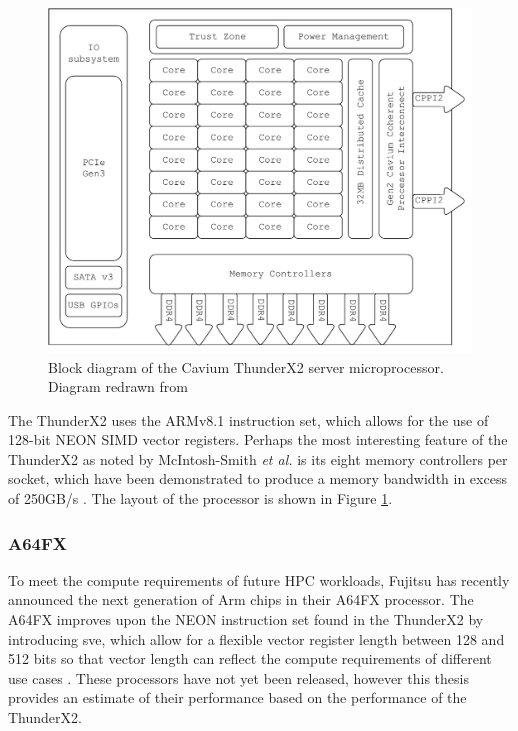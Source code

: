 \documentclass[a4paper,11pt]{report}
\begin{document}
\begin{figure}[htbp]
\begin{center}
\includegraphics[width=1\textwidth]{img/thunderx2.pdf}
\caption[Block diagram of the Cavium ThunderX2 server microprocessor]{Block diagram of the Cavium ThunderX2 server microprocessor. Diagram redrawn from \cite{thunderprocessor2018brief}}
\label{fig:thunderx2}
\end{center}
\end{figure}
\par
The ThunderX2 uses the ARMv8.1 instruction set, which allows for the use of 128-bit NEON SIMD vector registers. Perhaps the most interesting feature of the ThunderX2 as noted by McIntosh-Smith \textit{et al.} is its eight memory controllers per socket, which have been demonstrated to produce a memory bandwidth in excess of 250GB/s \cite{mcintosh2018performance}. The layout of the processor is shown in Figure \ref{fig:thunderx2}.

\subsubsection{A64FX}
To meet the compute requirements of future HPC workloads, Fujitsu has recently announced the next generation of Arm chips in their A64FX processor. The A64FX improves upon the NEON instruction set found in the ThunderX2 by introducing \gls{sve}, which allow for a flexible vector register length between 128 and 512 bits so that vector length can reflect the compute requirements of different use cases \cite{stephens2017arm, rico2017arm}. These processors have not yet been released, however this thesis provides an estimate of their performance based on the performance of the ThunderX2.
\end{document}
